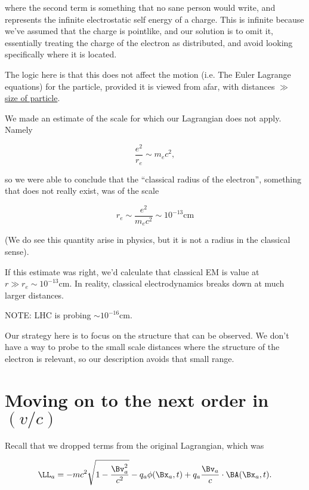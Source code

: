 where the second term is something that no sane person would write, and represents the infinite electrostatic self energy of a charge.  This is infinite because we've assumed that the charge is pointlike, and our solution is to omit it, essentially treating the charge of the electron as distributed, and avoid looking specifically where it is located.

The logic here is that this does not affect the motion (i.e. The Euler Lagrange equations) for the particle, provided it is viewed from afar, with distances $\gg$ \underline{size of particle}.

We made an estimate of the scale for which our Lagrangian does not apply.  Namely

\begin{equation}\label{eqn:relativisticElectrodynamicsL25:50}
\frac{e^2}{r_e} \sim m_e c^2,
\end{equation}

so we were able to conclude that the ``classical radius of the electron'', something that does not really exist, was of the scale

\begin{equation}\label{eqn:relativisticElectrodynamicsL25:70}
r_e \sim \frac{e^2 }{m_e c^2} \sim 10^{-13} \text{cm}
\end{equation}

(We do see this quantity arise in physics, but it is not a radius in the classical sense).

If this estimate was right, we'd calculate that classical EM is value at $r \gg r_e \sim 10^{-13} \text{cm}$.  In reality, classical electrodynamics breaks down at much larger distances.

NOTE: LHC is probing $\sim 10^{-16} \text{cm}$.

Our strategy here is to focus on the structure that can be observed.  We don't have a way to probe to the small scale distances where the structure of the electron is relevant, so our description avoids that small range.

\section{Moving on to the next order in $(v/c)$}

Recall that we dropped terms from the original Lagrangian, which was

\begin{equation}\label{eqn:relativisticElectrodynamicsL25:90}
\LL_a = - m c^2 \sqrt{ 1 - \frac{\Bv_a^2}{c^2}} - q_a \phi(\Bx_a, t) + q_a \frac{\Bv_a}{c} \cdot \BA(\Bx_a, t).
\end{equation}

